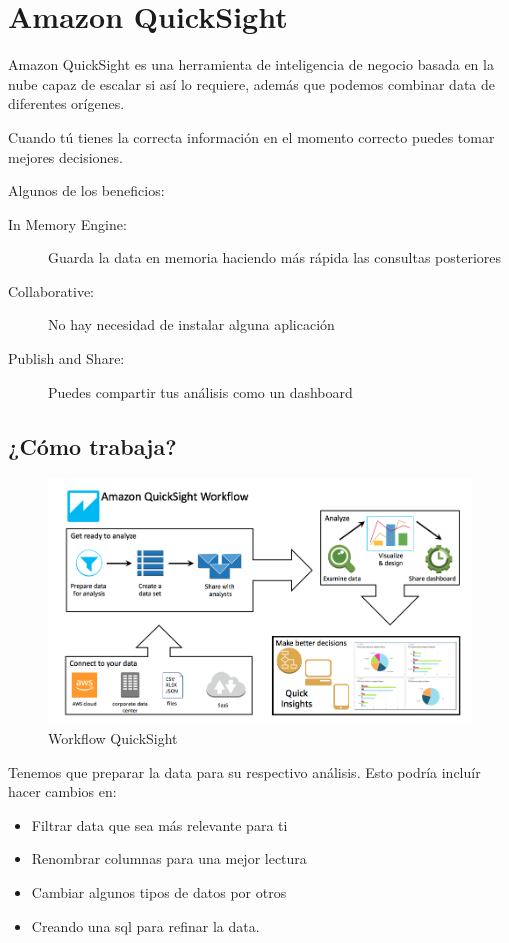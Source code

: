 \section{Amazon QuickSight}

Amazon QuickSight \cite{aws-quicksight} es una herramienta de inteligencia de negocio
basada en la nube capaz de escalar si así lo requiere, además que podemos combinar data de diferentes
orígenes.

Cuando tú tienes la correcta información en el momento correcto puedes tomar mejores decisiones.

Algunos de los beneficios: \
\begin{description}
	\item[In Memory Engine:] Guarda la data en memoria haciendo más rápida las consultas posteriores
	\item[Collaborative:] No hay necesidad de instalar alguna aplicación
	\item[Publish and Share:] Puedes compartir tus análisis como un dashboard
\end{description}

\subsection{¿Cómo trabaja?}
\begin{figure}[h!]
	\centering
	\includegraphics[width=\columnwidth]{images/aws_quicksight}
	\caption{Workflow QuickSight}
	\label{fig:quicksight_workflow}
\end{figure}

Tenemos que preparar la data para su respectivo análisis. Esto podría incluír hacer cambios en: \
\begin{itemize}
	\item Filtrar data que sea más relevante para ti
	\item Renombrar columnas para una mejor lectura
	\item Cambiar algunos tipos de datos por otros
	\item Creando una sql para refinar la data.
\end{itemize}

